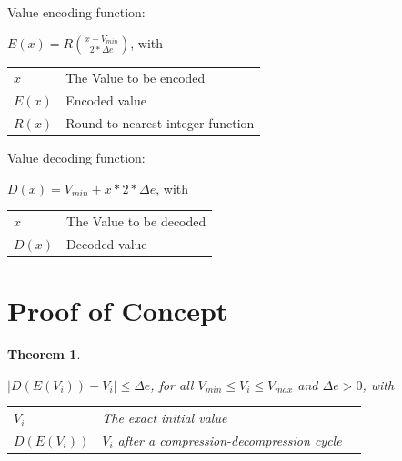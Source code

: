 \documentclass[
	12pt,
	a4paper,
	BCOR10mm,
	DIV14,
	headsepline,
]{scrreprt}
\newtheorem{theorem}{Theorem}
\begin{document}
\bigskip

Value encoding function:

\bigskip

\begin{center}
	$E\left(x\right) = R\left(\frac{x - V_{min}}{2 * \Delta{e}}\right)$, with

	\bigskip

	\begin{tabular}{ll}
		$x$ & The Value to be encoded \\
		$E\left(x\right)$ & Encoded value \\
		$R\left(x\right)$ & Round to nearest integer function
	\end{tabular}
\end{center}

\bigskip

Value decoding function:

\bigskip

\begin{center}
	$D\left(x\right) = V_{min} + x * 2 * \Delta{e}$, with

	\bigskip

	\begin{tabular}{ll}
		$x$ & The Value to be decoded \\
		$D\left(x\right)$ & Decoded value
	\end{tabular}
\end{center}

\clearpage

\section{Proof of Concept}

\bigskip

\begin{theorem}

	\mbox{} \bigskip

	\begin{center}
		$\lvert D\left(E\left(V_i\right)\right) - V_i\rvert \leq \Delta{e}$, for all $V_{min} \leq V_i \leq V_{max}$ and $\Delta{e} > 0$, with \\

		\bigskip

		\begin{tabular}{lll}
 			$V_i$ & The exact initial value \\
			$D\left(E\left(V_i\right)\right)$ & $V_i$ after a compression-decompression cycle \\
		\end{tabular}

	\end{center}

\end{theorem}
\end{document}
